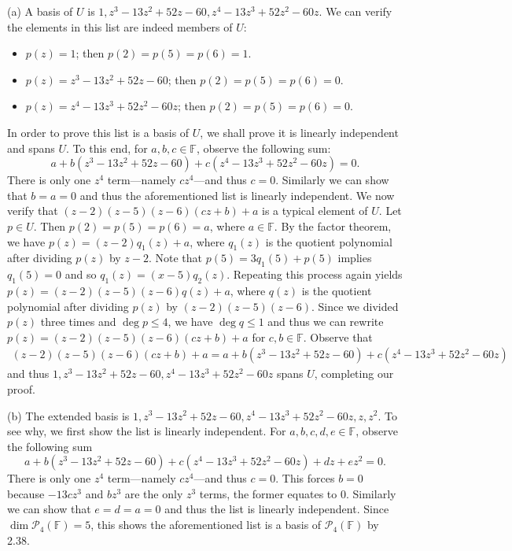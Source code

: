 \documentclass{exam}
\begin{document}
(a) A basis of $U$ is $1, z^3 - 13z^2 + 52z - 60, z^4 - 13z^3 + 52z^2 - 60z$. We can verify the elements in this list are indeed members of $U$:
\begin{itemize}
    \item $p(z) = 1$; then $p(2) = p(5) = p(6) = 1$.
    \item $p(z) = z^3 - 13z^2 + 52z - 60$; then $p(2) = p(5) = p(6) = 0$.
    \item $p(z) = z^4 - 13z^3 + 52z^2 - 60z$; then $p(2) = p(5) = p(6) = 0$.
\end{itemize}
In order to prove this list is a basis of $U$, we shall prove it is linearly independent and spans $U$. To this end, for $a, b, c\in\mathbb F$, observe the following sum: \[
    a + b(z^3 - 13z^2 + 52z - 60) + c(z^4 - 13z^3 + 52z^2 - 60z) = 0.
\]
There is only one $z^4$ term---namely $cz^4$---and thus $c = 0$. Similarly we can show that $b = a = 0$ and thus the aforementioned list is linearly independent. We now verify that $(z - 2)(z - 5)(z - 6)(cz + b) + a$ is a typical element of $U$. Let $p\in U$. Then $p(2) = p(5) = p(6) = a$, where $a\in\mathbb F$. By the factor theorem, we have $p(z) = (z - 2)q_1(z) + a$, where $q_1(z)$ is the quotient polynomial after dividing $p(z)$ by $z - 2$. Note that $p(5) = 3q_1(5) + p(5)$ implies $q_1(5) = 0$ and so $q_1(z) = (x - 5)q_2(z)$. Repeating this process again yields $p(z) = (z - 2)(z - 5)(z - 6)q(z) + a$, where $q(z)$ is the quotient polynomial after dividing $p(z)$ by $(z-2)(z-5)(z-6)$. Since we divided $p(z)$ three times and $\deg p\le 4$, we have $\deg q \le 1$ and thus we can rewrite $p(z) = (z - 2)(z - 5)(z - 6)(cz + b) + a$ for $c, b\in\mathbb F$. Observe that
\begin{align*}
    (z - 2)(z - 5)(z - 6)(cz + b) + a = a + b(z^3 - 13z^2 + 52z - 60) + c(z^4 - 13z^3 + 52z^2 - 60z)
\end{align*}
and thus $1, z^3 - 13z^2 + 52z - 60, z^4 - 13z^3 + 52z^2 - 60z$ spans $U$, completing our proof.

(b) The extended basis is $1, z^3 - 13z^2 + 52z - 60, z^4 - 13z^3 + 52z^2 - 60z, z, z^2$. To see why, we first show the list is linearly independent. For $a, b, c, d, e\in\mathbb F$, observe the following sum \[
    a + b(z^3 - 13z^2 + 52z - 60) + c(z^4 - 13z^3 + 52z^2 - 60z) + dz + ez^2 = 0.
\]
There is only one $z^4$ term---namely $cz^4$---and thus $c = 0$. This forces $b = 0$ because $-13cz^3$ and $bz^3$ are the only $z^3$ terms, the former equates to $0$. Similarly we can show that $e = d = a = 0$ and thus the list is linearly independent. Since $\dim\mathcal P_4(\mathbb F) = 5$, this shows the aforementioned list is a basis of $\mathcal P_4(\mathbb F)$ by 2.38.
\end{document}
